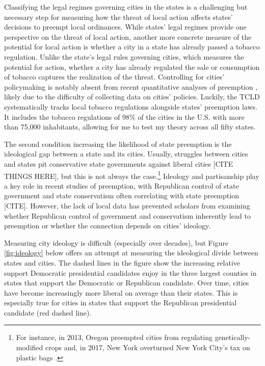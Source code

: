 \documentclass[12pt]{article}
\begin{document}
Classifying the legal regimes governing cities in the states is a challenging but necessary step for measuring how the threat of local action affects states' decisions to preempt local ordinances. While states' legal regimes provide one perspective on the threat of local action, another more concrete measure of the potential for local action is whether a city in a state has already passed a tobacco regulation. Unlike the state's legal rules governing cities, which measures the potential for action, whether a city has already regulated the sale or consumption of tobacco captures the realization of the threat. Controlling for cities' policymaking is notably absent from recent quantitative analyses of preemption \parencite{fowlerStatePreemptionLocal2019,goodmanStateLegislativeIdeology2019,flavinExplainingStatePreemption2019}, likely due to the difficulty of collecting data on cities' policies. Luckily, the TCLD systematically tracks local tobacco regulations alongside states' preemption laws. It includes the tobacco regulations of 98\% of the cities in the U.S. with more than 75,000 inhabitants, allowing for me to test my theory across all fifty states.

The second condition increasing the likelihood of state preemption is the ideological gap between a state and its cities. Usually, struggles between cities and states pit conservative state governments against liberal cities [CITE THINGS HERE], but this is not always the case.\footnote{For instance, in 2013, Oregon preempted cities from regulating genetically-modified crops and, in 2017, New York overturned New York City's tax on plastic bags \parencite{mckinleyCuomoBlocksNew2017,scharffHyperPreemptionReordering2018}.} Ideology and partisanship play a key role in recent studies of preemption, with Republican control of state government and state conservatism often correlating with state preemption [CITE]. However, the lack of local data has prevented scholars from examining whether Republican control of government and conservatism inherently lead to preemption or whether the connection depends on cities' ideology. 

Measuring city ideology is difficult (especially over decades), but Figure \ref{fig:ideology} below offers an attempt at measuring the ideological divide between states and cities. The dashed lines in the figure show the increasing relative support Democratic presidential candidates enjoy in the three largest counties in states that support the Democratic or Republican candidate. Over time, cities have become increasingly more liberal on average than their states. This is especially true for cities in states that support the Republican presidential candidate (red dashed line). 
\end{document}
